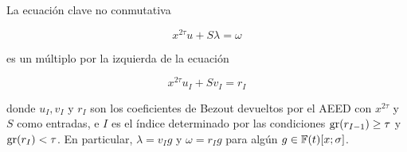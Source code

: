 \begin{teorema}\label{th:ec}
La ecuación clave no conmutativa 

\begin{equation}\label{eq:key}
x^{2\tau}u + S\lambda = \omega
\end{equation}

es un múltiplo por la izquierda de la ecuación 

\begin{equation}\label{eq:key2}
x^{2\tau}u_I + Sv_I = r_I
\end{equation}

donde $u_I,v_I$ y $r_I$ son los coeficientes de Bezout devueltos por el AEED con $x^{2\tau}$ y $S$ como entradas, e $I$ es el índice determinado por las condiciones $\operatorname{gr}(r_{I-1}) \geq \tau$ y $\operatorname{gr}(r_I) < \tau$. En particular, $\lambda = v_Ig$ y $\omega = r_Ig$ para algún $g \in \mathbb{F}(t)[x;\sigma]$.
\end{teorema}

